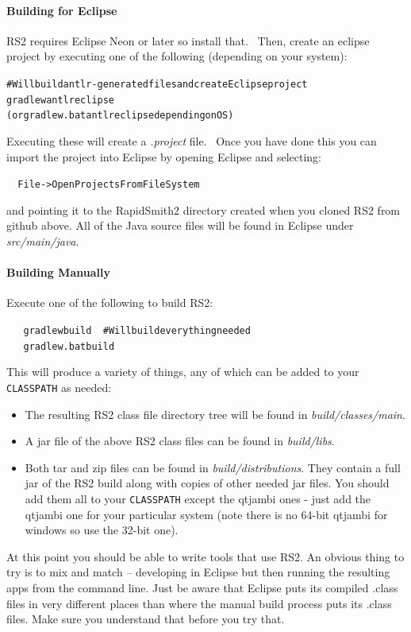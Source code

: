 \documentclass[12pt]{article}
\newcommand{\env}[1]{{\texttt{#1}}}
\newcommand{\fil}[1]{{\em #1}}
\newcommand{\dir}[1]{{\em #1}}
\newenvironment{code}{\begin{center} \begin{minipage}{6in} \noindent \begin{alltt}}{\end{alltt} \end{minipage} \end{center}}
\begin{document}
\paragraph{Building for Eclipse}  
RS2 requires Eclipse Neon or later so install that. 
Then, create an eclipse project by executing one of the following (depending on your system):

\vspace{-0.15in}  \begin{code}
# Will build antlr-generated files and create Eclipse project
gradlew antlr eclipse       
(or gradlew.bat antlr eclipse depending on OS)
\end{code} 
Executing these will create a \fil{.project} file.  Once you have done this you
can import the project into Eclipse by opening Eclipse and selecting: 
\vspace{-0.15in}  \begin{code}
    File->Open Projects From File System 
\end{code}
and pointing it to the RapidSmith2 directory created when you cloned RS2 from
github above. 
All of the Java source files will be found in Eclipse under \dir{src/main/java}.

\paragraph{Building Manually} 
Execute one of the following to build RS2: 
\vspace{-0.15in}  \begin{code}
     gradlew build     # Will build everything needed
     gradlew.bat build 
\end{code}
This will produce a variety of things, any of which can be added to your
\env{CLASSPATH} as needed:
\begin{itemize}
  \item The resulting RS2 class file directory tree will be found in
  \dir{build/classes/main}.
  \item	A jar file of the above RS2 class files can be
  found in \dir{build/libs}.
  \item Both tar and zip files can be found in \dir{build/distributions}. They
  contain a full jar of the RS2 build along with copies of other needed jar
  files. You should add them all to your \env{CLASSPATH} except the qtjambi ones
  - just add the qtjambi one for your particular system (note there is no 64-bit
  qtjambi for windows so use the 32-bit one).
\end{itemize}
At this point you should be able to write tools that use RS2.
An obvious thing to try is to mix and match – developing in Eclipse but then
running the resulting apps from the command line.  Just be aware that Eclipse
puts its compiled .class files in very different places than where the manual
build process puts its .class files.  Make sure you understand that before you
try that.
\end{document}

